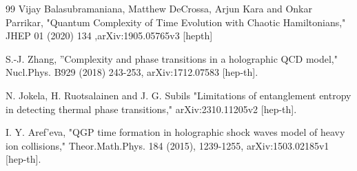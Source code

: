 \documentclass[]{article}
\begin{document}
\begin{thebibliography}{99}
Vijay Balasubramaniana, Matthew DeCrossa, Arjun Kara and Onkar Parrikar, "Quantum
Complexity of Time Evolution with Chaotic Hamiltonians," JHEP 01 (2020) 134 ,arXiv:1905.05765v3 [hepth]

S.-J. Zhang, ''Complexity and phase transitions in a holographic QCD model," Nucl.Phys. B929 (2018) 243-253,  arXiv:1712.07583 [hep-th].

N. Jokela, H. Ruotsalainen and J. G. Subils "Limitations of entanglement entropy in detecting thermal phase transitions,"  arXiv:2310.11205v2 [hep-th].

I. Y. Aref'eva, "QGP time formation in holographic shock waves model of heavy ion collisions," Theor.Math.Phys. 184 (2015), 1239-1255, arXiv:1503.02185v1 [hep-th].



\end{thebibliography}
\end{document}
